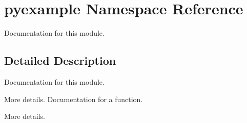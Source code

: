 \hypertarget{namespacepyexample}{}\section{pyexample Namespace Reference}
\label{namespacepyexample}


Documentation for this module.  




\subsection{Detailed Description}
Documentation for this module. 

More details. Documentation for a function.

More details. 